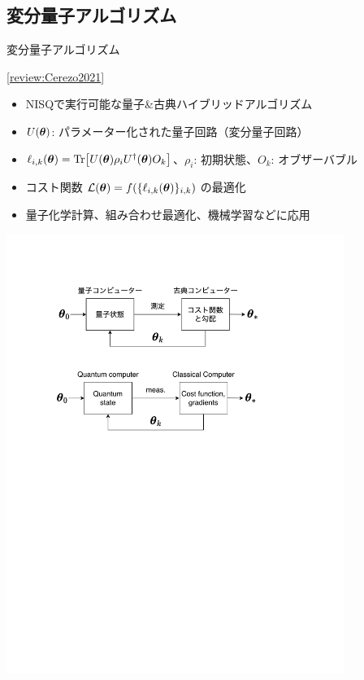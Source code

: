 \documentclass[dvipdfmx,10pt,aspectratio=169]{beamer}
\begin{document}
\subsection{変分量子アルゴリズム}
\begin{frame}{変分量子アルゴリズム}
    \vspace*{-10pt}
    \begin{center}
        {\large\colorbox{blue!40}{ {\small[\href{http://arxiv.org/abs/2012.09265}{review:Cerezo2021}]} }}
    \end{center}

    \begin{center}
        \begin{minipage}{0.8\textwidth}
            \begin{itemize}
                \item NISQで実行可能な量子\&古典ハイブリッドアルゴリズム
                \item $U(\vb*{\theta})$: パラメーター化された量子回路（変分量子回路）
                \item $\ell_{i,k}(\vb*{\theta}) = \Tr[U(\vb*{\theta})\rho_i U^\dagger(\vb*{\theta})O_k]$、$\rho_i$: 初期状態、$O_k$: オブザーバブル
                \item コスト関数 $\mathcal{L}(\vb*{\theta}) = f(\{\ell_{i,k}(\vb*{\theta})\}_{i,k})$ の最適化
                \item 量子化学計算、組み合わせ最適化、機械学習などに応用
            \end{itemize}
        \end{minipage}
    \end{center}

    \centering\includegraphics[width=11cm]{vqa-flow.pdf}
\end{frame}
\end{document}
